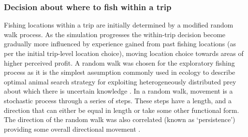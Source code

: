 \documentclass[preprint]{elsarticle}
\begin{document}
\subsubsection{Decision about where to fish within a trip}

Fishing locations within a trip are initially determined by a modified random
walk process. As the simulation progresses the within-trip decision become
gradually more influenced by experience gained from past fishing locations (as
per the initial trip-level location choice), moving location choice towards
areas of higher perceived profit. A random walk was chosen for the exploratory
fishing process as it is the simplest assumption commonly used in ecology to
describe optimal animal search strategy for exploiting heterogeneously
distributed prey about which there is uncertain knowledge
\citep{Viswanathan1999}. In a random walk, movement is a stochastic process
through a series of steps. These steps have a length, and a direction that can
either be equal in length or take some other functional form. The direction of
the random walk was also correlated (known as `persistence') providing some
overall directional movement \citep{Codling2008}. \\
\end{document}

